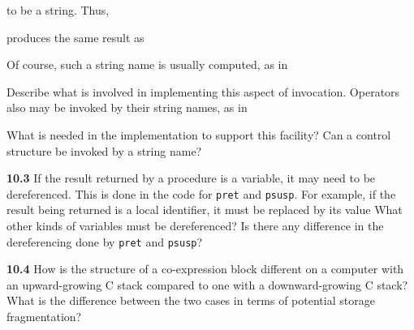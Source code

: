 
\noindent to be a string. Thus,


\noindent produces the same result as


Of course, such a string name is usually computed, as in


Describe what is involved in implementing this aspect of
invocation. Operators also may be invoked by their string names, as in


What is needed in the implementation to support this facility? Can a
control structure be invoked by a string name?

\textbf{10.3} If the result returned by a procedure is a variable, it
may need to be dereferenced. This is done in the code for
\texttt{pret} and \texttt{psusp}. For example, if the result being
returned is a local identifier, it must be replaced by its value What
other kinds of variables must be dereferenced? Is there any difference
in the dereferencing done by \texttt{pret} and \texttt{psusp}?

\textbf{10.4} How is the structure of a co-expression block different
on a computer with an upward-growing C stack compared to one with a
downward-growing C stack? What is the difference between the two cases
in terms of potential storage fragmentation?
